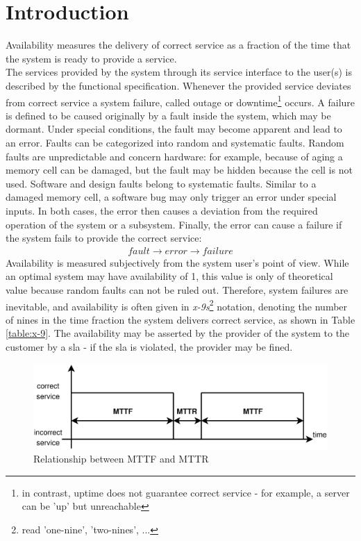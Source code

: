 \section{Introduction}\label{sec:availability}

Availability measures the delivery of correct service as a fraction of the time that the system is ready to provide a service. 
\\
The services provided by the system through its service interface to the user(s) 
is described by the functional specification. Whenever the provided service
deviates from correct service a system failure, called outage or downtime\footnote{in contrast, uptime does not guarantee correct
service - for example, a server can be 'up' but unreachable} occurs. A failure is defined to be caused originally by a fault inside the system, which may be 
dormant. Under special conditions, the fault may become apparent and lead to an error. Faults can be categorized into random and systematic faults.
Random faults are unpredictable and concern hardware: for example, because of aging a memory cell can be damaged, but the fault may be hidden because the cell
is not used. Software and design faults belong to systematic faults. Similar to a damaged memory cell, a software bug may only 
trigger an error under special inputs. In both cases, the error then causes a deviation from the required operation of the system or a subsystem. Finally, the 
error can cause a failure if the system fails to provide the correct service:
\begin{align*}
 fault \rightarrow error \rightarrow failure
\end{align*}
Availability is measured subjectively from the system user's point of view.
While an optimal system may have availability of 1, this value is only of theoretical value because random faults can not be ruled out. Therefore,
system failures are inevitable, and availability is often given in \textit{x-9s}\footnote{read 'one-nine', 'two-nines', ...} notation, denoting the 
number of nines in the time fraction the system delivers correct service, as shown in Table \ref{table:x-9}.
The availability may be asserted by the provider of the system to the customer by a
\gls{sla} - if the \gls{sla} is violated, the provider may be fined.
\begin{figure}
    \centering
    \includegraphics[width=1\textwidth]{figures/availability.eps}
    \caption{Relationship between MTTF and MTTR}
    \label{fig:relmttfmttr}
\end{figure}

